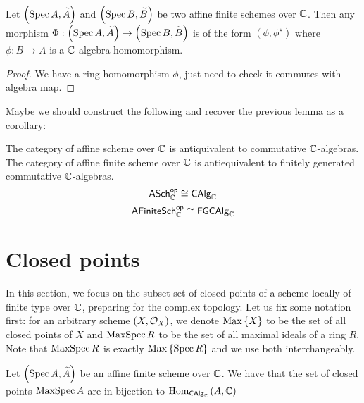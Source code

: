 \begin{proposition}
  Let $\left(\operatorname*{Spec}{A}, \widetilde{A}\right)$ and $\left(\operatorname*{Spec}{B}, \widetilde{B}\right)$ be two affine finite schemes over $\mathbb{C}$. Then any morphism $\Phi : \left(\operatorname*{Spec}{A}, \widetilde{A}\right) \to \left(\operatorname*{Spec}{B}, \widetilde{B}\right)$ is of the form $(\phi, \phi^{\star})$ where $\phi : B \to A$ is a $\mathbb{C}$-algebra homomorphism.
\end{proposition}

\begin{proof}
  We have a ring homomorphism $\phi$, just need to check it commutes with algebra map.
\end{proof}

Maybe we should construct the following and recover the previous lemma as a corollary:
\begin{proposition}
  The category of affine scheme over $\mathbb{C}$ is antiquivalent to commutative $\mathbb{C}$-algebras.
  The category of affine finite scheme over $\mathbb{C}$ is antiequivalent to finitely generated commutative $\mathbb{C}$-algebras.
  \[
    \mathsf{ASch}_{\mathbb{C}}^{\mathsf{op}}\cong \mathsf{CAlg}_{\mathbb{C}}
  \]
  \[
    \mathsf{AFiniteSch}_{\mathbb{C}}^{\mathsf{op}}\cong \mathsf{FGCAlg}_{\mathbb{C}}
  \]
\end{proposition}

\section{Closed points}
In this section, we focus on the subset set of closed points of a scheme locally of finite type over $\mathbb{C}$, preparing for the complex topology. Let us fix some notation first: for an arbitrary scheme $\left(X, \mathcal{O}_{X}\right)$, we denote $\operatorname{Max}\left\{X\right\}$ to be the set of all closed points of $X$ and $\operatorname{MaxSpec} R$ to be the set of all maximal ideals of a ring $R$. Note that $\operatorname{MaxSpec} R$ is exactly $\operatorname{Max}\left\{\operatorname{Spec}{R}\right\}$ and we use both interchangeably.



\begin{proposition}\label{thm:affine-scheme-closed-points-biject-algebra-hom}
  Let $\left(\operatorname*{Spec}{A}, \widetilde{A}\right)$ be an affine finite scheme over $\mathbb{C}$. We have that the set of closed points $\operatorname{MaxSpec} A$ are in bijection to
  $\operatorname{Hom}_{\mathsf{CAlg}_{\mathbb{C}}}\left(A, \mathbb{C}\right)$
\end{proposition}

